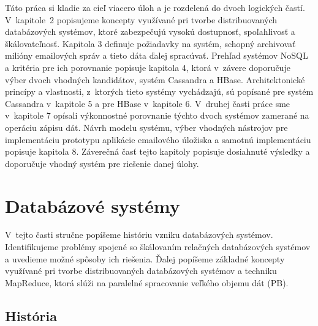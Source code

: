 \documentclass[11pt,twoside,a4paper]{book}
\begin{document}
Táto práca si kladie za cieľ viacero úloh a je rozdelená do dvoch logických častí. V~kapitole~2 popisujeme koncepty využívané pri tvorbe distribuovaných databázových systémov, ktoré zabezpečujú vysokú dostupnosť, spoľahlivosť a škálovateľnosť. Kapitola 3 definuje požiadavky na systém, schopný archivovať milióny emailových správ a tieto dáta ďalej spracúvať. Prehľad systémov NoSQL a kritéria pre ich porovnanie popisuje kapitola 4, ktorá v~závere doporučuje výber dvoch vhodných kandidátov, systém Cassandra a HBase. Architektonické princípy a vlastnosti, z~ktorých tieto systémy vychádzajú, sú popísané pre systém Cassandra v~kapitole 5 a pre HBase v~kapitole 6.
V~druhej časti práce sme v~kapitole 7 opísali výkonnostné porovnanie týchto dvoch systémov zamerané na operáciu zápisu dát. Návrh modelu systému, výber vhodných nástrojov pre implementáciu prototypu aplikácie emailového úložiska a samotnú implementáciu popisuje kapitola 8. Záverečná časť tejto kapitoly popisuje dosiahnuté výsledky a doporučuje vhodný systém pre riešenie danej úlohy.







\chapter{Databázové systémy}

V~tejto časti stručne popíšeme históriu vzniku databázových systémov. Identifikujeme problémy spojené so škálovaním relačných databázových systémov a uvedieme možné spôsoby ich riešenia. Ďalej popíšeme základné koncepty využívané pri tvorbe distribuovaných databázových systémov a techniku MapReduce, ktorá slúži na paralelné spracovanie veľkého objemu dát (PB).

\section{História}
\end{document}
